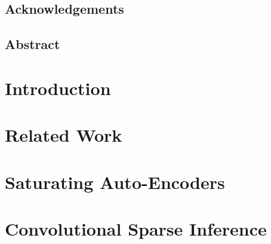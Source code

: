 \documentclass[12pt,letterpaper]{report}
\begin{document}
\section*{Acknowledgements}

\newpage
\section*{Abstract}

\newpage
\tableofcontents
\cleardoublepage
{}
\listoffigures
\newpage

\listoftables{}
\newpage


\chapter{Introduction} 
\label{chapter:introduction} 

\chapter{Related Work}
\label{chapter:related_work}
 
\chapter{Saturating Auto-Encoders}
\label{chapter:SATAE}

\chapter{Convolutional Sparse Inference}
\label{chapter:LISTA} 
 
\end{document}
